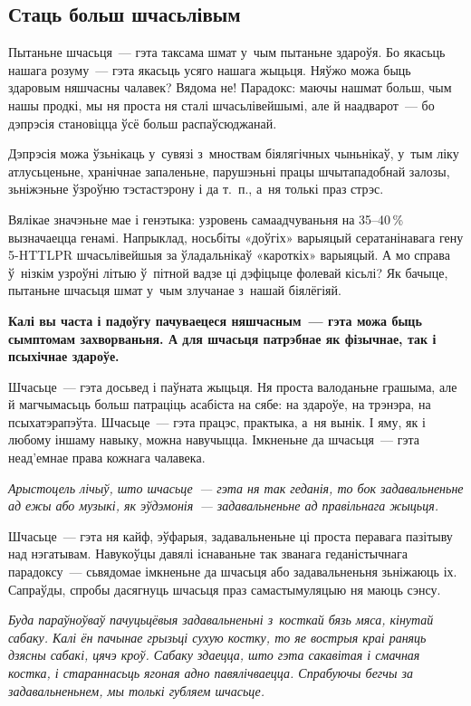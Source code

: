 \subsection*{Стаць больш шчасьлівым}

Пытаньне шчасьця~--- гэта таксама шмат у~чым пытаньне здароўя. Бо якасьць нашага розуму~--- гэта якасьць усяго нашага жыцьця. Няўжо можа быць здаровым няшчасны чалавек? Вядома не! Парадокс: маючы нашмат больш, чым нашы продкі, мы ня проста ня сталі шчасьлівейшымі, але й наадварот~--- бо дэпрэсія становіцца ўсё больш распаўсюджанай.

Дэпрэсія можа ўзьнікаць у~сувязі з~мноствам біялягічных чыньнікаў, у~тым ліку атлусьценьне, хранічнае запаленьне, парушэньні працы шчытападобнай залозы, зьніжэньне ўзроўню тэстастэрону і да т.~п., а~ня толькі праз стрэс.

Вялікае значэньне мае і генэтыка: узровень самаадчуваньня на 35--40\,\% вызначаецца генамі. Напрыклад, носьбіты «доўгіх» варыяцый сератанінавага гену 5-HTTLPR шчасьлівейшыя за ўладальнікаў «кароткіх» варыяцый. А мо справа ў~нізкім узроўні літыю ў~пітной вадзе ці дэфіцыце фолевай кісьлі? Як бачыце, пытаньне шчасьця шмат у~чым злучанае з~нашай біялёгіяй.

\textbf{Калі вы часта і падоўгу пачуваецеся няшчасным~--- гэта можа быць сымптомам захворваньня. А для шчасьця патрэбнае як фізычнае, так і псыхічнае здароўе.}

Шчасьце~--- гэта досьвед і паўната жыцьця. Ня проста валоданьне грашыма, але й магчымасьць больш патраціць асабіста на сябе: на здароўе, на трэнэра, на псыхатэрапэўта. Шчасьце~--- гэта працэс, практыка, а~ня вынік. І яму, як і любому іншаму навыку, можна навучыцца. Імкненьне да шчасьця~--- гэта неад'емнае права кожнага чалавека.

\emph{Арыстоцель лічыў, што шчасьце~--- гэта ня так геданія, то бок задавальненьне ад ежы або музыкі, як эўдэмонія~--- задавальненьне ад правільнага жыцьця.}

Шчасьце~--- гэта ня кайф, эўфарыя, задавальненьне ці проста перавага пазітыву над нэгатывам. Навукоўцы давялі існаваньне так званага геданістычнага парадоксу~--- сьвядомае імкненьне да шчасьця або задавальненьня зьніжаюць іх. Сапраўды, спробы дасягнуць шчасьця праз самастымуляцыю ня маюць сэнсу.

\emph{Буда параўноўваў пачуцьцёвыя задавальненьні з~косткай бязь мяса, кінутай сабаку. Калі ён пачынае грызьці сухую костку, то яе вострыя краі раняць дзясны сабакі, цячэ кроў. Сабаку здаецца, што гэта сакавітая і смачная костка, і стараннасьць ягоная адно павялічваецца. Спрабуючы бегчы за задавальненьнем, мы толькі губляем шчасьце.}

